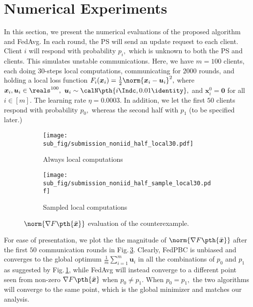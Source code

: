 \documentclass[letterpaper, 10 pt, conference]{ieeeconf}  %
\newcommand{\x}{{\bm x}}
\newcommand{\bu}{{\bm u}}
\begin{document}
\section{Numerical Experiments}
\label{sec: numerical}
In this section, we present the numerical evaluations of the proposed algorithm and {FedAvg}. 
In each round, the PS will send an update request to each client. %
Client $i$ will respond with probability $p_i,$ which is unknown to both the PS and clients. This simulates unstable communications.
\newline
{} 
Here, we have $m = 100$ clients, each doing $30$-steps local computations, 
communicating for $2000$ rounds,
and holding a local loss function $F_i(\x_i) = \frac{1}{2}\norm{\x_i - \bu_i}^2,$
where $\x_i, \bu_i \in \reals^{100},$ 
$\bu_i\sim \calN \pth{ i \Indc, 0.01 \identity },$
and $\x_i^0=\bm{0}$
for all $i\in[m].$
The learning rate $\eta = 0.0003.$
In addition, we let the first $50$ clients respond with probability $p_0,$ whereas the second half with $p_1$ (to be specified later.)
\setlength{\parskip}{0mm}
\begin{figure}[!htb]
\begin{subfigure}[b]{\columnwidth}
\centering
\texttt{[image: sub\_fig/submission\_noniid\_half\_local30.pdf]}
\vskip -1pt
\caption{Always local computations}
\label{fig: always counter}
\end{subfigure}
\begin{subfigure}[b]{\columnwidth}
\centering
\texttt{[image: sub\_fig/submission\_noniid\_half\_sample\_local30.pdf]}
\vskip -1pt
\caption{Sampled local computations}
\label{fig: sampled counter}
\end{subfigure}
\vskip -1pt
\caption{$\norm{\nabla F \pth{\bar{\x}}}$ evaluation of the counterexample.}
\label{fig: counterexample}
\end{figure}
\setlength{\parskip}{0mm}
\newline
For ease of presentation, we plot the the magnitude of $\norm{\nabla F \pth{\bar{\x}}}$ after the first $50$ communication rounds in Fig.\,\ref{fig: counterexample}. 
Clearly, {FedPBC} is unbiased and converges to the global optimum $\frac{1}{m}\sum_{i=1}^m \bu_i$ in all the combinations of $p_0$ and $p_1$ as suggested by Fig.\,\ref{fig: always counter}, while {FedAvg} will instead converge to a different point seen from non-zero $\nabla F\pth{\bar{\x}}$ when $p_0 \neq p_1$. When $p_0=p_1,$ the two algorithms will converge to the same point, which is the global minimizer and matches our analysis.
\end{document}

